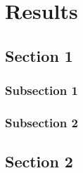 
\chapter{Results} %

\label{chap:results} %


\section{Section 1}

\subsection{Subsection 1}



\subsection{Subsection 2}


\section{Section 2}

